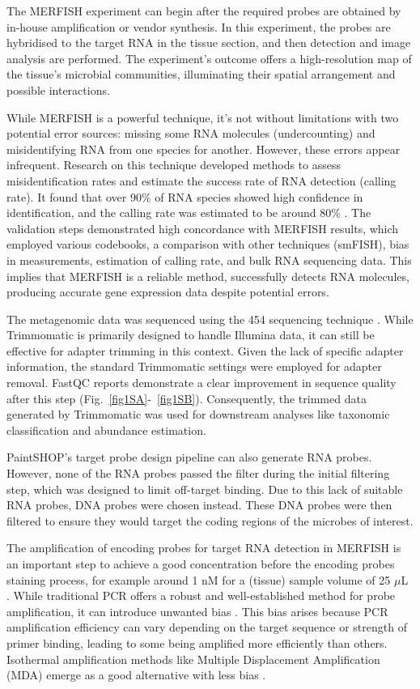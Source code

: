 \documentclass[10pt,letterpaper]{article}
\begin{document}
\noindent The MERFISH experiment can begin after the required probes are obtained by in-house amplification or vendor synthesis. In this experiment, the probes are hybridised to the target RNA in the tissue section, and then detection and image analysis are performed. The experiment's outcome offers a high-resolution map of the tissue's microbial communities, illuminating their spatial arrangement and possible interactions.

\noindent While MERFISH is a powerful technique, it's not without limitations with two potential error sources: missing some RNA molecules (undercounting) and misidentifying RNA from one species for another. However, these errors appear infrequent. Research on this technique developed methods to assess misidentification rates and estimate the success rate of RNA detection (calling rate). It found that over 90\% of RNA species showed high confidence in identification, and the calling rate was estimated to be around 80\% \parencite{chen-2015}. The validation steps demonstrated high concordance with MERFISH results, which employed various codebooks, a comparison with other techniques (smFISH), bias in measurements, estimation of calling rate, and bulk RNA sequencing data. This implies that MERFISH is a reliable method, successfully detects RNA molecules, producing accurate gene expression data despite potential errors. 

\noindent The metagenomic data was sequenced using the 454 sequencing technique \parencite{campos-2023}. While Trimmomatic is primarily designed to handle Illumina data, it can still be effective for adapter trimming in this context. Given the lack of specific adapter information, the standard Trimmomatic settings were employed for adapter removal. FastQC reports demonstrate a clear improvement in sequence quality after this step (Fig.~\ref{fig1SA}-~\ref{fig1SB}). Consequently, the trimmed data generated by Trimmomatic was used for downstream analyses like taxonomic classification and abundance estimation.

\noindent PaintSHOP's target probe design pipeline can also generate RNA probes. However, none of the RNA probes passed the filter during the initial filtering step, which was designed to limit off-target binding. Due to this lack of suitable RNA probes, DNA probes were chosen instead. These DNA probes were then filtered to ensure they would target the coding regions of the microbes of interest.

\noindent The amplification of encoding probes for target RNA detection in MERFISH is an important step to achieve a good concentration before the encoding probes staining process, for example around 1 nM for a (tissue) sample volume of 25 \ensuremath{\mu}L \parencite{xia-2019}. While traditional PCR offers a robust and well-established method for probe amplification, it can introduce unwanted bias \parencite{polz-1998}. This bias arises because PCR amplification efficiency can vary depending on the target sequence or strength of primer binding, leading to some being amplified more efficiently than others. Isothermal amplification methods like Multiple Displacement Amplification (MDA) emerge as a good alternative with less bias \parencite{spits-2006}\parencite{zanoli-2012}. 
\end{document}
